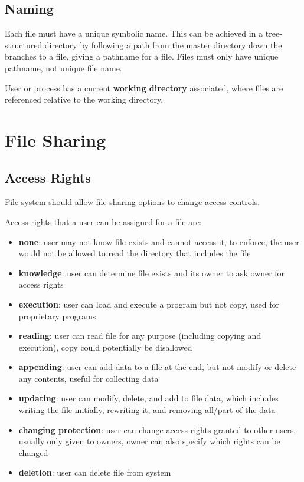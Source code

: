 \documentclass[11pt]{article}
\begin{document}
\subsection{Naming}
\label{sec:orgff28754}
Each file must have a unique symbolic name.
This can be achieved in a tree-structured directory by following a path from the master directory
down the branches to a file, giving a pathname for a file.
Files must only have unique pathname, not unique file name.

User or process has a current \textbf{working directory} associated, where files are referenced relative
to the working directory.
\section{File Sharing}
\label{sec:org6c35b6a}
\subsection{Access Rights}
\label{sec:orgb9399d7}
File system should allow file sharing options to change access controls.

Access rights that a user can be assigned for a file are:
\begin{itemize}
\item \textbf{none}: user may not know file exists and cannot access it, to enforce, the user would not be
allowed to read the directory that includes the file
\item \textbf{knowledge}: user can determine file exists and its owner to ask owner for access rights
\item \textbf{execution}: user can load and execute a program but not copy, used for proprietary programs
\item \textbf{reading}: user can read file for any purpose (including copying and execution), copy could
potentially be disallowed
\item \textbf{appending}: user can add data to a file at the end, but not modify or delete any contents, useful
for collecting data
\item \textbf{updating}: user can modify, delete, and add to file data, which includes writing the file initially,
rewriting it, and removing all/part of the data
\item \textbf{changing protection}: user can change access rights granted to other users, usually only given
to owners, owner can also specify which rights can be changed
\item \textbf{deletion}: user can delete file from system
\end{itemize}
\end{document}
